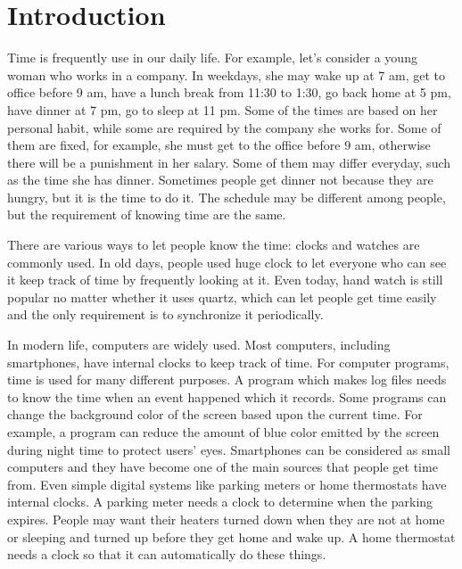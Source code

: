 


\chapter{Introduction}
Time is frequently use in our daily life. For example, let's consider a young
woman who works in a company. In weekdays, she may wake up at 7 am, get to
office before 9 am, have a lunch break from 11:30 to 1:30, go back home at 5
pm, have dinner at 7 pm, go to sleep at 11 pm. Some of the times are based on
her personal habit, while some are required by the company she works for.
Some of them are fixed, for example, she must get to the office before 9 am,
otherwise there will be a punishment in her salary. Some of them may differ
everyday, such as the time she has dinner. Sometimes people get dinner not
because they are hungry, but it is the time to do it. The schedule may be
different among people, but the requirement of knowing time are the same.

There are various ways to let people know the time: clocks and watches are
commonly used. In old days, people used huge clock to let everyone who can see
it keep track of time by frequently looking at it. Even today, hand watch is
still popular no matter whether it uses quartz, which can let people get time
easily and the only requirement is to synchronize it periodically.

In modern life, computers are widely used. Most computers, including
smartphones, have internal clocks to keep track of time. For computer programs, 
time is used for many different purposes. A program which makes log files needs
to know the time when an event happened which it records. Some programs can
change the background color of the screen based upon the current time. For
example, a program can reduce the amount of blue color emitted by the screen
during night time to protect users' eyes.
Smartphones can be considered as small computers and they have become one of
the main sources that people get time from. Even simple digital systems
like parking meters or home thermostats have internal clocks. A parking
meter needs a clock to determine when the parking expires. People may want
their heaters turned down when they are not at home or sleeping and turned up
before they get home and wake up. A home thermostat needs a clock so that it
can automatically do these things.

